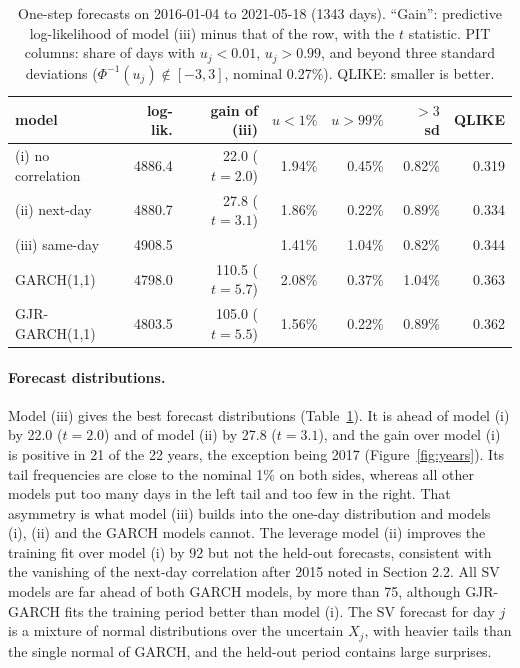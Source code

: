 \begin{table}[t]
        \centering
        \small
        \caption{One-step forecasts on 2016-01-04 to 2021-05-18 (1343 days). ``Gain'': predictive log-likelihood of model (iii) minus that of the row, with the $t$ statistic. PIT columns: share of days with $u_j < 0.01$, $u_j > 0.99$, and beyond three standard deviations ($\Phi^{-1}(u_j) \notin [-3, 3]$, nominal 0.27\%). QLIKE: smaller is better.}
        \label{tab:fc}
        \begin{tabular}{lrrrrrr}
                \toprule
                model & log-lik. & gain of (iii) & $u < 1\%$ & $u > 99\%$ & ${>}3$ sd & QLIKE \\
                \midrule
                (i) no correlation & 4886.4 & 22.0 ($t = 2.0$) & 1.94\% & 0.45\% & 0.82\% & 0.319 \\
                (ii) next-day & 4880.7 & 27.8 ($t = 3.1$) & 1.86\% & 0.22\% & 0.89\% & 0.334 \\
                (iii) same-day & 4908.5 & & 1.41\% & 1.04\% & 0.82\% & 0.344 \\
                GARCH(1,1) & 4798.0 & 110.5 ($t = 5.7$) & 2.08\% & 0.37\% & 1.04\% & 0.363 \\
                GJR-GARCH(1,1) & 4803.5 & 105.0 ($t = 5.5$) & 1.56\% & 0.22\% & 0.89\% & 0.362 \\
                \bottomrule
        \end{tabular}
\end{table}

\paragraph{Forecast distributions.} Model (iii) gives the best forecast distributions (Table~\ref{tab:fc}). It is ahead of model (i) by 22.0 ($t = 2.0$) and of model (ii) by 27.8 ($t = 3.1$), and the gain over model (i) is positive in 21 of the 22 years, the exception being 2017 (Figure~\ref{fig:years}). Its tail frequencies are close to the nominal 1\% on both sides, whereas all other models put too many days in the left tail and too few in the right. That asymmetry is what model (iii) builds into the one-day distribution and models (i), (ii) and the GARCH models cannot. The leverage model (ii) improves the training fit over model (i) by 92 but not the held-out forecasts, consistent with the vanishing of the next-day correlation after 2015 noted in Section 2.2. All SV models are far ahead of both GARCH models, by more than 75, although GJR-GARCH fits the training period better than model (i). The SV forecast for day $j$ is a mixture of normal distributions over the uncertain $X_j$, with heavier tails than the single normal of GARCH, and the held-out period contains large surprises.


